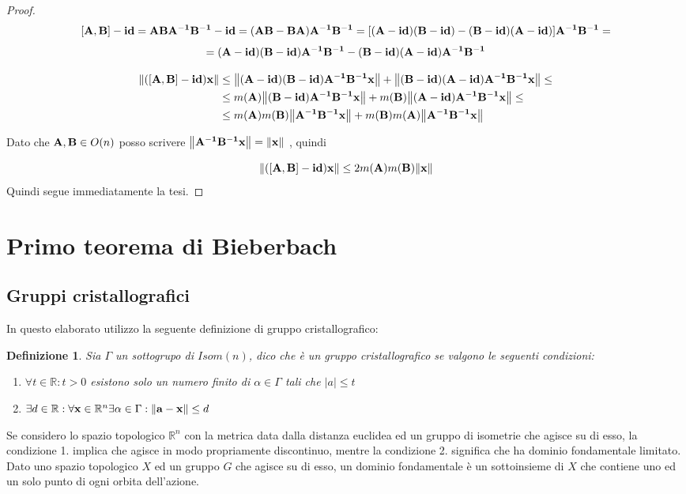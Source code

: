 \documentclass[10pt,a4paper]{article}
\newtheorem{definition}{Definizione}[section]
\begin{document}
\begin{proof}



\[ [\vb{A,B}] - \vb{id} = \vb{ABA^{-1}B^{-1} - id }= \vb{(AB -BA)A^{-1}B^{-1} }= [ \vb{ (A-id)(B-id) - (B-id)(A-id)}] \vb{A^{-1}B^{-1}} = \]
 \[  = \vb{( A-id)(B-id) A^{-1}B^{-1} -  (B-id)(A-id) A^{-1}B^{-1}} \]
 
 
 \begin{equation} 
\begin{split}
\norm{\vb{([A,B] - id )x}} & \leq \norm{\vb{ ( A-id)(B-id) A^{-1}B^{-1}x}} +  \norm{\vb{(B-id)(A-id) A^{-1}B^{-1}x}} \leq \\
& \leq m(\vb{A}) \norm{\vb{(B-id) A^{-1}B^{-1}x}} + m(\vb{B}) \norm{\vb{(A-id) A^{-1}B^{-1}x}} \leq \\ 
& \leq m(\vb{A})m(\vb{B})\norm{\vb{A^{-1}B^{-1}x}} + m(\vb{B})m(\vb{A}) \norm{\vb{A^{-1}B^{-1}x}}
\end{split}
\end{equation}

Dato che $ \vb{A,B} \in O(n)$ posso scrivere $\norm{\vb{A^{-1}B^{-1}x}} = \norm{\vb{x}} $ , quindi 

\begin{equation}
  \norm{\vb{([A,B] - id )x}}  \leq 2m(\vb{A})m(\vb{B})\norm{\vb{x}}
\end{equation} 
Quindi segue immediatamente la tesi. 
\end{proof}
\pagebreak
\section{Primo teorema di Bieberbach}
\subsection{Gruppi cristallografici}
In questo elaborato utilizzo la seguente definizione di gruppo cristallografico:
\begin{definition}
Sia $\Gamma$ un sottogrupo di $Isom(n)$, dico che è un gruppo cristallografico se valgono le seguenti condizioni:
\begin{enumerate}
	\item $ \forall t \in \mathbb{R} : t > 0 $  esistono solo un numero finito di $\alpha \in \Gamma $  tali che  $|a| \leq t$

	\item $ \exists d \in \mathbb{R}: \forall \vb{x} \in \mathbb{R}^n   \exists \alpha \in \Gamma : \norm{\vb{a-x}}\leq d $
\end{enumerate}
\end{definition}
Se considero lo spazio topologico $\mathbb{R}^n$ con la metrica data dalla distanza euclidea ed un gruppo di isometrie che agisce su di esso, la condizione 1. implica che agisce in modo propriamente discontinuo, mentre la condizione 2. significa che ha dominio fondamentale limitato. Dato uno spazio topologico $X$ ed un gruppo $G$ che agisce su di esso, un dominio fondamentale è un sottoinsieme di $X$ che contiene uno ed un solo punto di ogni orbita dell'azione.
\end{document}
